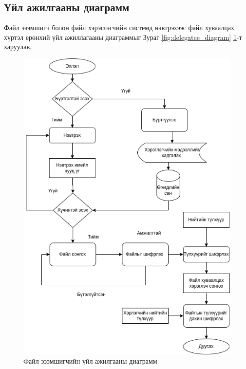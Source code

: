 \subsection*{Үйл ажилгааны диаграмм}
Файл эзэмшигч болон файл хэрэглэгчийн системд нэвтрэхээс файл хуваалцах хүртэл ерөнхий үйл ажиллагааны диаграммыг Зураг \ref{fig:delegatee_diagram} \ref{fig:delegator_diagram}-т харуулав.

\begin{figure}[H]
    \centering
    \includegraphics[scale=0.4]{Figures/system_schemes/delegator.drawio.png}
    \caption[pyUmbral]{Файл эзэмшигчийн үйл ажилгааны диаграмм}
    \label{fig:delegator_diagram}
\end{figure}

